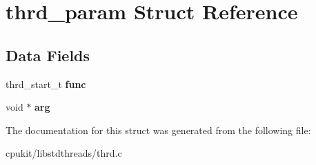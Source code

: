 \hypertarget{structthrd__param}{}\section{thrd\+\_\+param Struct Reference}
\label{structthrd__param}
\subsection*{Data Fields}
\begin{DoxyCompactItemize}
\item 
\mbox{\label{structthrd__param_ab4a00e2d65641d14801c1a785537a6f9}} 
thrd\+\_\+start\+\_\+t {\bfseries func}
\item 
\mbox{\label{structthrd__param_ab1ad445c713a97f6fcdff5b2de673c4a}} 
void $\ast$ {\bfseries arg}
\end{DoxyCompactItemize}


The documentation for this struct was generated from the following file\+:\begin{DoxyCompactItemize}
\item 
cpukit/libstdthreads/thrd.\+c\end{DoxyCompactItemize}
